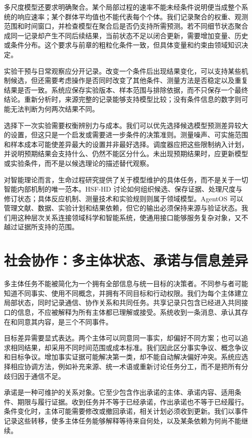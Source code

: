 多尺度模型还要求明确聚合。某个局部过程的速率不能未经条件说明便当成整个系统的响应速率；某个群体平均值也不能代表每个个体。我们记录聚合的权重、观测范围和时间窗口，并检查模型在聚合后是否仍支持所需预测。若不同细节状态聚合成同一记录却产生不同后续结果，当前状态不足以闭合更新，需要增加变量、历史或条件分布。这个要求与前章的粗粒化条件一致，但具体变量和约束由领域知识决定。

实验干预与日常观察应分开记录。改变一个条件后出现结果变化，可以支持某些机制候选，但还需要考虑操作是否同时改变了其他条件、测量方法是否稳定以及重复结果是否一致。系统应保存实验版本、样本范围与排除依据，而不只保存一个最终结论。重新分析时，来源完整的记录能够支持模型比较；没有条件信息的数字则可能无法判断为何两次结果不同。

选择下一次实验需要权衡辨别力与成本。我们可以优先选择候选模型预测差异较大的设置，但这只是一个启发或需要进一步条件的决策准则。测量噪声、可实施范围和样本成本可能使差异最大的设置并非最好选择。调度器应把这些限制纳入计划，并说明预期结果会支持什么、仍然不能区分什么。未出现预期结果时，应更新模型或实验条件，而不是以候选理论的描述替代观察。

对智能理论而言，生命过程研究提供了关于模型维护的具体任务，而不是关于一切智能内部机制的唯一范本。HSF-HD 讨论如何组织候选、保存证据、处理尺度与修订状态；具体反应机制、测量技术和实验规则则属于领域模型。AgentOS 可以管理文献、数据、实验计划和结果依赖，但它的输出必须保持来源与验证状态。我们用这种层次关系连接领域科学和智能系统，使通用接口能够服务复杂对象，又不越过证据所支持的范围。

\section{社会协作：多主体状态、承诺与信息差异}
\label{sec:manifold_of_society}

多主体任务不能被简化为一个拥有全部信息与统一目标的决策者。不同参与者可能知道不同事实、使用不同概念，并拥有不同目标和行动权限。我们为每个主体建立局部状态，同时记录通信、协作关系和共同任务。共享记录只包含已经进入共同接口的信息，不应被解释为所有主体都已理解或接受。系统收到一条消息、承认其存在和同意其内容，是三个不同事件。

目标差异需要显式表达。两个主体可以同意同一事实，却偏好不同方案；也可以追求相同结果，却采用不同时间范围或成本标准。我们因此区分事实争议、概念争议和目标争议。增加事实证据可能解决第一类，却不能自动解决偏好冲突。系统应选择相应协调方法，例如补充来源、统一术语或重新讨论任务分工，而不是把所有分歧归因于通信不足。

承诺是一种可维护的关系对象。它至少包含作出承诺的主体、承诺内容、适用条件、期限与履行证据。收到任务并不等于已经承诺，作出承诺也不等于已经履行。条件变化时，主体可能需要修改或撤回承诺，相关计划必须收到更新。我们以事件记录这些转移，使多主体任务能够解释等待来自何处，以及某条依赖为何尚不能继续。

